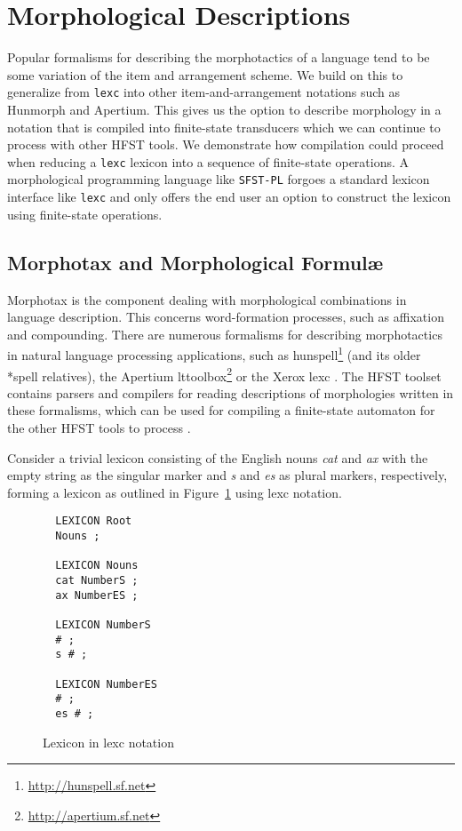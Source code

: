 \documentclass{llncs}
\begin{document}
\section{Morphological Descriptions}\label{MorphTools}


Popular formalisms for describing the morphotactics of a language tend to be some variation 
of the item and arrangement scheme. We build on this to generalize from \verb!lexc! into other
item-and-arrangement notations such as Hunmorph and Apertium. This gives us the option to describe 
morphology in a notation that is compiled into finite-state transducers which we can continue to process with other
HFST tools. We demonstrate how compilation could proceed when reducing a \verb!lexc! lexicon into a sequence of
finite-state operations. A morphological programming language like \verb!SFST-PL! forgoes a standard lexicon interface
like \verb!lexc! and only offers the end user an option to construct the lexicon using finite-state operations. 

\subsection{Morphotax and Morphological Formul\ae}

Morphotax is the component dealing with morphological combinations in language
description. This concerns word-formation processes, such as affixation and
compounding.  There are numerous formalisms for describing morphotactics in natural
language processing applications, such as
hunspell\footnote{\url{http://hunspell.sf.net}} (and its older *spell
relatives), the Apertium lttoolbox\footnote{\url{http://apertium.sf.net}} or
the Xerox lexc \cite{beesley/2003}. The HFST toolset contains parsers and
compilers for reading descriptions of morphologies written in these formalisms,
which can be used for compiling a finite-state automaton for the other HFST
tools to process \cite{pirinen/2010/il,linden/2009/sfcm}.

Consider a trivial lexicon consisting of the English nouns \emph{cat} and
\emph{ax} with the empty string as the singular marker and \emph{s} and
\emph{es} as plural markers, respectively,  forming a lexicon as outlined in
Figure~\ref{fig:morph0} using lexc notation.

\begin{figure} [h]
{\footnotesize
\begin{verbatim}
  LEXICON Root
  Nouns ;

  LEXICON Nouns
  cat NumberS ;
  ax NumberES ;

  LEXICON NumberS
  # ;
  s # ;

  LEXICON NumberES
  # ;
  es # ;
\end{verbatim}
}
\caption{Lexicon in lexc notation}
\label{fig:morph0}
\end{figure}
\end{document}
